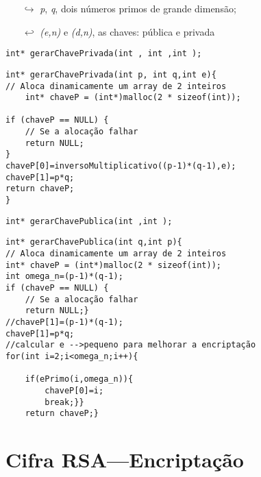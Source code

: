\begin{itemize}
    \item[$\hookrightarrow$] \emph{p}, \emph{q}, dois números primos de grande dimensão;
    \item[$\hookleftarrow$] \emph{(e,n)} e \emph{(d,n)}, as chaves: pública e privada
\end{itemize}
\begin{lstlisting}[frame=single,mathescape=true,caption={Cifra RSA ---Especificação de \texttt{GerarChavePrivada}},captionpos=b,label={lst:gerarChavePrivada},basicstyle=\footnotesize]
int* gerarChavePrivada(int , int ,int );
\end{lstlisting}
\begin{lstlisting}[frame=single,mathescape=true,caption={Gerar chave privada},captionpos=b,label={lst:Gerar chave privada},basicstyle=\footnotesize]
int* gerarChavePrivada(int p, int q,int e){
// Aloca dinamicamente um array de 2 inteiros
    int* chaveP = (int*)malloc(2 * sizeof(int)); 

if (chaveP == NULL) {
    // Se a alocação falhar
    return NULL;
}
chaveP[0]=inversoMultiplicativo((p-1)*(q-1),e);
chaveP[1]=p*q;
return chaveP;
}
\end{lstlisting}
\begin{lstlisting}[frame=single,mathescape=true,caption={Cifra RSA ---Especificação de \texttt{GerarChavePública}},captionpos=b,label={lst:gerarChavePublica},basicstyle=\footnotesize]
int* gerarChavePublica(int ,int );
\end{lstlisting}
\begin{lstlisting}[frame=single,mathescape=true,caption={Gerar chave privada},captionpos=b,label={lst:Gerar chave privada},basicstyle=\footnotesize]
int* gerarChavePublica(int q,int p){
// Aloca dinamicamente um array de 2 inteiros
int* chaveP = (int*)malloc(2 * sizeof(int)); 
int omega_n=(p-1)*(q-1);
if (chaveP == NULL) {
    // Se a alocação falhar
    return NULL;}
//chaveP[1]=(p-1)*(q-1);
chaveP[1]=p*q;
//calcular e -->pequeno para melhorar a encriptação
for(int i=2;i<omega_n;i++){
    
    if(ePrimo(i,omega_n)){
        chaveP[0]=i;
        break;}}
    return chaveP;}
\end{lstlisting}


\section{Cifra RSA---Encriptação}
\label{ec:cifraRSAencriptacao}

